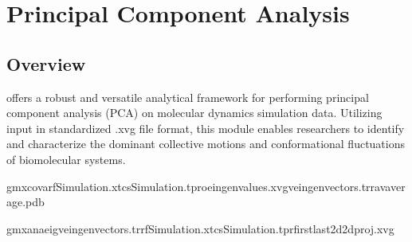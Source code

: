 \documentclass[a4paper,10pt,english]{sphinxmanual}
\begin{document}
\begin{sphinxVerbatim}[commandchars=\\\{\}]
        \PYG{p}{[}\PYG{p}{]} \PYG{p}{[}  \PYG{p}{]}

  
  
\end{sphinxVerbatim}

\sphinxstepscope


\chapter{Principal Component Analysis}
\label{\detokenize{PCA:principal-component-analysis}}\label{\detokenize{PCA::doc}}

\section{Overview}
\label{\detokenize{PCA:overview}}
\sphinxAtStartPar
{} offers a robust and versatile analytical framework for performing principal component analysis (PCA) on molecular dynamics simulation data. Utilizing input in standardized .xvg file format, this module enables researchers to identify and characterize the dominant collective motions and conformational fluctuations of biomolecular systems.

\sphinxAtStartPar
{}

\begin{sphinxVerbatim}[commandchars=\\\{\}]
gmxcovar\PYGZhy{}fSimulation.xtc\PYGZhy{}sSimulation.tpr\PYGZhy{}oeingenvalues.xvg\PYGZhy{}veingenvectors.trr\PYGZhy{}avaverage.pdb
\end{sphinxVerbatim}

\begin{sphinxVerbatim}[commandchars=\\\{\}]
gmxanaeig\PYGZhy{}veingenvectors.trr\PYGZhy{}fSimulation.xtc\PYGZhy{}sSimulation.tpr\PYGZhy{}first\PYGZhy{}last\PYGZhy{}2d2dproj.xvg
\end{sphinxVerbatim}
\end{document}
